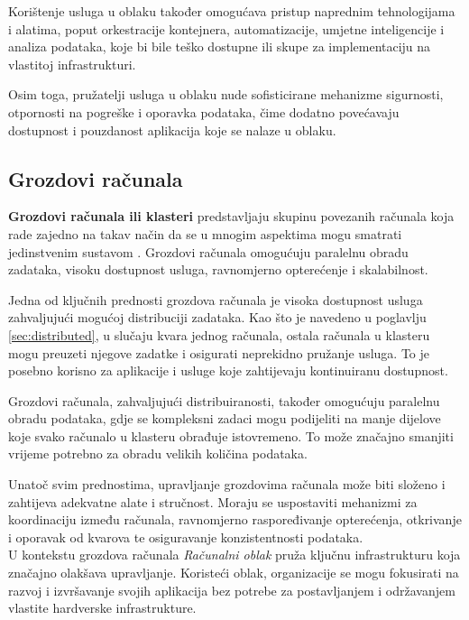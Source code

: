 \documentclass[times, utf8, diplomski]{fer}
\begin{document}
Korištenje usluga u oblaku također omogućava pristup naprednim tehnologijama i alatima, poput orkestracije kontejnera, automatizacije, umjetne inteligencije i analiza podataka, koje bi bile teško dostupne ili skupe za implementaciju na vlastitoj infrastrukturi.

Osim toga, pružatelji usluga u oblaku nude sofisticirane mehanizme sigurnosti, otpornosti na pogreške i oporavka podataka, čime dodatno povećavaju dostupnost i pouzdanost aplikacija koje se nalaze u oblaku.

\subsection{Grozdovi računala}

\textbf{Grozdovi računala ili klasteri}  predstavljaju skupinu povezanih računala koja rade zajedno na takav način da se u mnogim aspektima mogu smatrati jedinstvenim sustavom \citep{zarko_raspodijeljeni_2013}. Grozdovi računala omogućuju paralelnu obradu zadataka, visoku dostupnost usluga, ravnomjerno opterećenje i skalabilnost.

Jedna od ključnih prednosti grozdova računala je visoka dostupnost usluga zahvaljujući mogućoj distribuciji zadataka. Kao što je navedeno u poglavlju \ref{sec:distributed}, u slučaju kvara jednog računala, ostala računala u klasteru mogu preuzeti njegove zadatke i osigurati neprekidno pružanje usluga. To je posebno korisno za aplikacije i usluge koje zahtijevaju kontinuiranu dostupnost.

Grozdovi računala, zahvaljujući distribuiranosti, također omogućuju paralelnu obradu podataka, gdje se kompleksni zadaci mogu podijeliti na manje dijelove koje svako računalo u klasteru obrađuje istovremeno. To može značajno smanjiti vrijeme potrebno za obradu velikih količina podataka.

Unatoč svim prednostima, upravljanje grozdovima računala može biti složeno i zahtijeva adekvatne alate i stručnost. Moraju se uspostaviti mehanizmi za koordinaciju između računala, ravnomjerno raspoređivanje opterećenja, otkrivanje i oporavak od kvarova te osiguravanje konzistentnosti podataka. \\

U kontekstu grozdova računala \emph{Računalni oblak}  pruža ključnu infrastrukturu koja značajno olakšava upravljanje. Koristeći oblak, organizacije se mogu fokusirati na razvoj i izvršavanje svojih aplikacija bez potrebe za postavljanjem i održavanjem vlastite hardverske infrastrukture.
\end{document}
